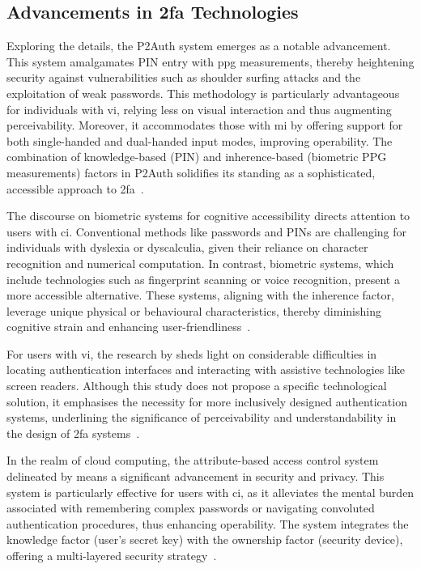 \subsection{Advancements in \acs{2fa} Technologies}
\label{sec:future:advancements}

Exploring the details, the P2Auth system emerges as a notable advancement. This system amalgamates PIN entry with \ac{ppg} measurements, thereby heightening security against vulnerabilities such as shoulder surfing attacks and the exploitation of weak passwords. This methodology is particularly advantageous for individuals with \ac{vi}, relying less on visual interaction and thus augmenting perceivability. Moreover, it accommodates those with \ac{mi} by offering support for both single-handed and dual-handed input modes, improving operability. The combination of knowledge-based (PIN) and inherence-based (biometric PPG measurements) factors in P2Auth solidifies its standing as a sophisticated, accessible approach to \ac{2fa}~\cite{su_2023}.

The discourse on biometric systems for cognitive accessibility directs attention to users with \ac{ci}. Conventional methods like passwords and PINs are challenging for individuals with dyslexia or dyscalculia, given their reliance on character recognition and numerical computation. In contrast, biometric systems, which include technologies such as fingerprint scanning or voice recognition, present a more accessible alternative. These systems, aligning with the inherence factor, leverage unique physical or behavioural characteristics, thereby diminishing cognitive strain and enhancing user-friendliness~\cite{dicampi_2023}.

\pspace{}For users with \ac{vi}, the research by \citeauthor{dosono_2015} sheds light on considerable difficulties in locating authentication interfaces and interacting with assistive technologies like screen readers. Although this study does not propose a specific technological solution, it emphasises the necessity for more inclusively designed authentication systems, underlining the significance of perceivability and understandability in the design of \ac{2fa} systems~\cite{dosono_2015}.

In the realm of cloud computing, the attribute-based access control system delineated by \citeauthor{liu_2015} means a significant advancement in security and privacy. This system is particularly effective for users with \ac{ci}, as it alleviates the mental burden associated with remembering complex passwords or navigating convoluted authentication procedures, thus enhancing operability. The system integrates the knowledge factor (user's secret key) with the ownership factor (security device), offering a multi-layered security strategy~\cite{liu_2015}.

